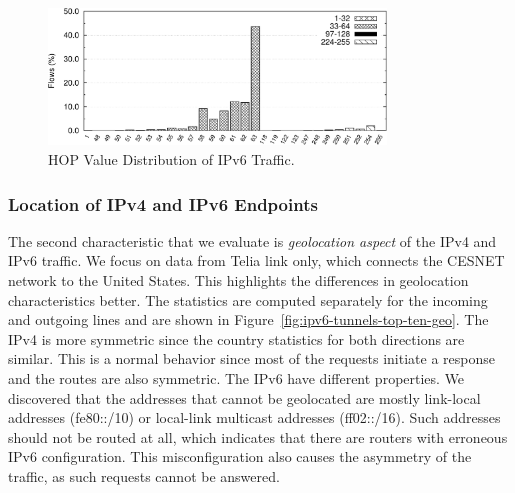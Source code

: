 \begin{figure}[tb]
        \centering
        \includegraphics[width=0.8\textwidth]{figures/paper-tunnels/ttl/native-hop}
        \caption{HOP Value Distribution of IPv6 Traffic.}
        \label{fig:ipv6-tunnels-ipv6-native-hop}
\end{figure}


\subsubsection{Location of IPv4 and IPv6 Endpoints}
The second characteristic that we evaluate is \textit{geolocation aspect} of the IPv4 and IPv6 traffic. We focus on data from Telia link only, which connects the CESNET network to the United States. This highlights the differences in geolocation characteristics better. The statistics are computed separately for the incoming and outgoing lines and are shown in Figure~\ref{fig:ipv6-tunnels-top-ten-geo}. The IPv4 is more symmetric since the country statistics for both directions are similar. This is a normal behavior since most of the requests initiate a response and the routes are also symmetric. The IPv6 have different properties. We discovered that the addresses that cannot be geolocated are mostly link-local addresses (fe80::/10) or local-link multicast addresses (ff02::/16). Such addresses should not be routed at all, which indicates that there are routers with erroneous IPv6 configuration. This misconfiguration also causes the asymmetry of the traffic, as such requests cannot be answered.

